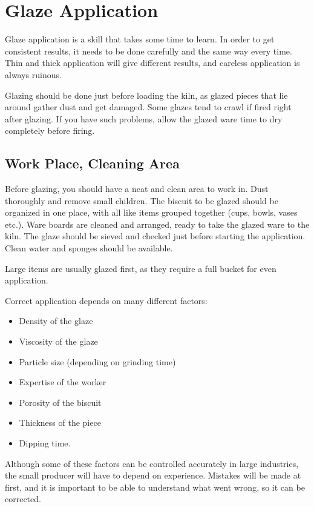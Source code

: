 \chapter{Glaze Application}
Glaze application is a skill that takes some time to learn. In order to get 
consistent results, it needs to be done carefully and the same way every time. 
Thin and thick application will give different results, and careless 
application is always ruinous.

Glazing should be done just before loading the kiln, as glazed pieces that lie 
around gather dust and get damaged. Some glazes tend to crawl if fired right 
after glazing. If you have such problems, allow the glazed ware time to dry 
completely before firing.
\section{Work Place, Cleaning Area}
Before glazing, you should have a neat and clean area to work in. Dust 
thoroughly and remove small children. The biscuit to be glazed should be 
organized in one place, with all like items grouped together (cups, bowls, 
vases etc.). Ware boards are cleaned and arranged, ready to take the glazed 
ware to the kiln. The glaze should be sieved and checked just before starting 
the application. Clean water and sponges should be available.

Large items are usually glazed first, as they require a full bucket for even 
application.

Correct application depends on many different factors:
\begin{itemize}
\item Density of the glaze
\item Viscosity of the glaze
\item Particle size (depending on grinding time)
\item Expertise of the worker
\item Porosity of the biscuit
\item Thickness of the piece
\item Dipping time.
\end{itemize}
Although some of these factors can be controlled accurately in large 
industries, the small producer will have to depend on experience. Mistakes will 
be made at first, and it is important to be able to understand what went wrong, 
so it can be corrected.
